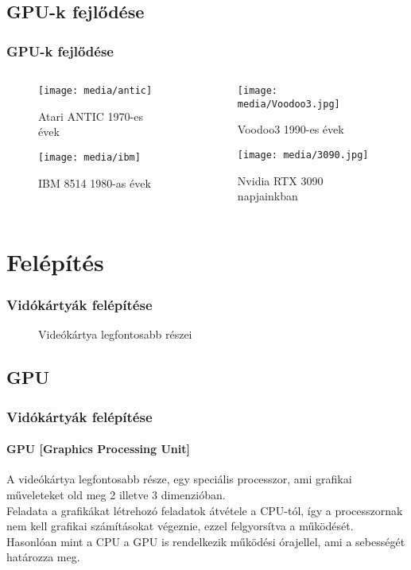 \documentclass{beamer}
\begin{document}
\subsection{GPU-k fejlődése}
\begin{frame}
\frametitle{GPU-k fejlődése}
\begin{columns}[onlytextwidth]
\begin{column}{0.5\textwidth}
\centering

\begin{figure}
\texttt{[image: media/antic]}
\caption{Atari ANTIC 1970-es évek}
\end{figure}

\begin{figure}
\texttt{[image: media/ibm]}
\caption{IBM 8514 1980-as évek}
\end{figure}

\end{column}
\begin{column}{0.5\textwidth}
\centering

\begin{figure}
\texttt{[image: media/Voodoo3.jpg]}
\caption{Voodoo3 1990-es évek}
\end{figure}

\begin{figure}
\texttt{[image: media/3090.jpg]}
\caption{Nvidia RTX 3090 napjainkban}
\end{figure}

\end{column}
\end{columns}
\end{frame}

\section{Felépítés}
\begin{frame}
\frametitle{Vidókártyák felépítése}
\begin{figure}
\centering
{}
\caption{Videókártya legfontosabb részei}
\end{figure}

\end{frame}
\subsection{GPU}
\begin{frame}
\frametitle{Vidókártyák felépítése}
\framesubtitle{GPU [Graphics Processing Unit]}
A videókártya legfontosabb része, egy speciális processzor, ami grafikai műveleteket old meg 2 illetve 3 dimenzióban.\\
Feladata a grafikákat létrehozó feladatok átvétele a CPU-tól, így a processzornak nem kell grafikai számításokat végeznie, ezzel felgyorsítva a működését.\\
Hasonlóan mint a CPU a GPU is rendelkezik működési órajellel, ami a sebességét határozza meg.
\end{frame}
\end{document}
